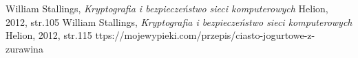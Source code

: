 \documentclass[12pt, letterpaper, titlepage]{article}
\begin{document}
\begin{thebibliography}{9}
 William Stallings,
 \textit{Kryptografia  i  bezpieczeństwo  sieci  komputerowych}
 Helion, 2012, str.105
  William Stallings,
 \textit{Kryptografia  i  bezpieczeństwo  sieci  komputerowych}
 Helion, 2012, str.115
   ttps://mojewypieki.com/przepis/ciasto-jogurtowe-z-zurawina
\end{thebibliography}
\end{document}
